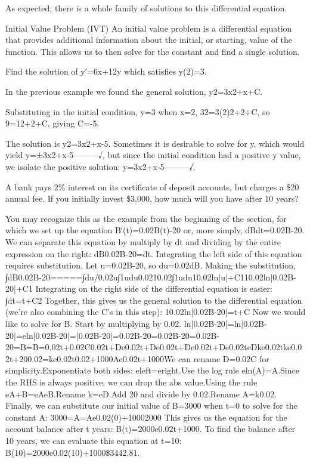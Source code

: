 As expected, there is a whole family of solutions to this differential equation.

Initial Value Problem (IVT)
An initial value problem is a differential equation that provides additional information about the initial, or starting, value of the function. This allows us to then solve for the constant and find a single solution.

\begin{example}
Find the solution of y′=6x+12y which satisfies y(2)=3.

\begin{solution}
  In the previous example we found the general solution, y2=3x2+x+C.

Substituting in the initial condition, y=3 when x=2,
32=3(2)2+2+C,
so 9=12+2+C, giving C=-5.

The solution is
y2=3x2+x-5.
Sometimes it is desirable to solve for y, which would yield y=±3x2+x-5---------√, but since the initial condition had a positive y value, we isolate the positive solution:
y=3x2+x-5---------√.
\end{solution}\end{example}

\begin{example}
A bank pays 2\% interest on its certificate of deposit accounts, but charges a \$20 annual fee. If you initially invest \$3,000, how much will you have after 10 years?

\begin{solution}
  You may recognize this as the example from the beginning of the section, for which we set up the equation B′(t)=0.02B(t)-20 or, more simply,
dBdt=0.02B-20.
We can separate this equation by multiply by dt and dividing by the entire expression on the right:
dB0.02B-20=dt.
Integrating the left side of this equation requires substitution. Let u=0.02B-20, so du=0.02dB. Making the substitution,
∫dB0.02B-20=====∫du/0.02u∫1udu0.0210.02∫1udu10.02ln|u|+C110.02ln|0.02B-20|+C1
Integrating on the right side of the differential equation is easier:
∫dt=t+C2
Together, this gives us the general solution to the differential equation (we're also combining the C's in this step):
10.02ln|0.02B-20|=t+C
Now we would like to solve for B. Start by multiplying by 0.02.
ln|0.02B-20|=ln|0.02B-20|=eln|0.02B-20|=|0.02B-20|=0.02B-20=0.02B-20=0.02B-20=B=B=0.02t+0.02C0.02t+De0.02t+De0.02t+De0.02t+De0.02teDke0.02tke0.02t+200.02=ke0.02t0.02+1000Ae0.02t+1000We can rename D=0.02C for simplicity.Exponentiate both sides: eleft=eright.Use the log rule eln(A)=A.Since the RHS is always positive, we can drop the abs value.Using the rule eA+B=eAeB.Rename k=eD.Add 20 and divide by 0.02.Rename A=k0.02.
Finally, we can substitute our initial value of B=3000 when t=0 to solve for the constant A:
3000=A=Ae0.02(0)+10002000
This gives us the equation for the account balance after t years:
B(t)=2000e0.02t+1000.
To find the balance after 10 years, we can evaluate this equation at t=10:
B(10)=2000e0.02(10)+1000\approx   \$3442.81.
\end{solution}\end{example}

